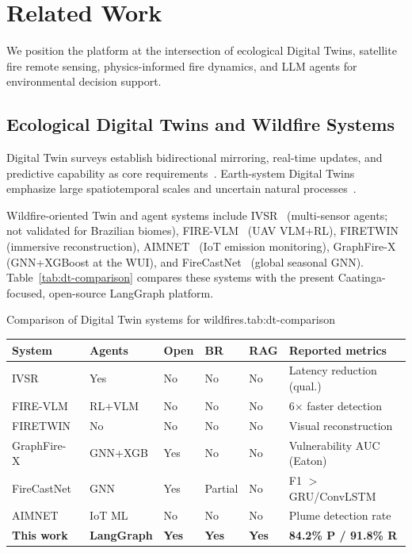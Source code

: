 \documentclass[preprint,12pt,times,numbers]{elsarticle}
\begin{document}
\section{Related Work}
\label{sec:related}

We position the platform at the intersection of ecological Digital Twins, satellite fire remote sensing, physics-informed fire dynamics, and LLM agents for environmental decision support.

\subsection{Ecological Digital Twins and Wildfire Systems}

Digital Twin surveys establish bidirectional mirroring, real-time updates, and predictive capability as core requirements~\cite{article:grieves2014,article:tao2019,article:barricelli2019,article:fuller2020}. Earth-system Digital Twins emphasize large spatiotemporal scales and uncertain natural processes~\cite{article:bauer2021natcc,article:nativi2021,article:voosen2020}.

Wildfire-oriented Twin and agent systems include IVSR~\cite{article:morsali2026} (multi-sensor agents; not validated for Brazilian biomes), FIRE-VLM~\cite{article:webb2026} (UAV VLM+RL), FIRETWIN~\cite{article:raha2025} (immersive reconstruction), AIMNET~\cite{article:aimnet2025} (IoT emission monitoring), GraphFire-X~\cite{article:esparza2025} (GNN+XGBoost at the WUI), and FireCastNet~\cite{article:michail2025} (global seasonal GNN). Table~\ref{tab:dt-comparison} compares these systems with the present Caatinga-focused, open-source LangGraph platform.

\begin{resulttable}{Comparison of Digital Twin systems for wildfires.}{tab:dt-comparison}
\footnotesize
\begin{tabular}{@{}lp{1.6cm}p{1.0cm}p{0.9cm}p{0.9cm}p{2.6cm}@{}}
\toprule
\textbf{System} & \textbf{Agents} & \textbf{Open} & \textbf{BR} & \textbf{RAG} & \textbf{Reported metrics} \\
\midrule
IVSR~\cite{article:morsali2026} & Yes & No & No & No & Latency reduction (qual.) \\
FIRE-VLM~\cite{article:webb2026} & RL+VLM & No & No & No & 6$\times$ faster detection \\
FIRETWIN~\cite{article:raha2025} & No & No & No & No & Visual reconstruction \\
GraphFire-X~\cite{article:esparza2025} & GNN+XGB & Yes & No & No & Vulnerability AUC (Eaton) \\
FireCastNet~\cite{article:michail2025} & GNN & Yes & Partial & No & F1 $>$ GRU/ConvLSTM \\
AIMNET~\cite{article:aimnet2025} & IoT ML & No & No & No & Plume detection rate \\
\textbf{This work} & \textbf{LangGraph} & \textbf{Yes} & \textbf{Yes} & \textbf{Yes} & \textbf{84.2\% P / 91.8\% R} \\
\bottomrule
\end{tabular}
\end{resulttable}
\end{document}
